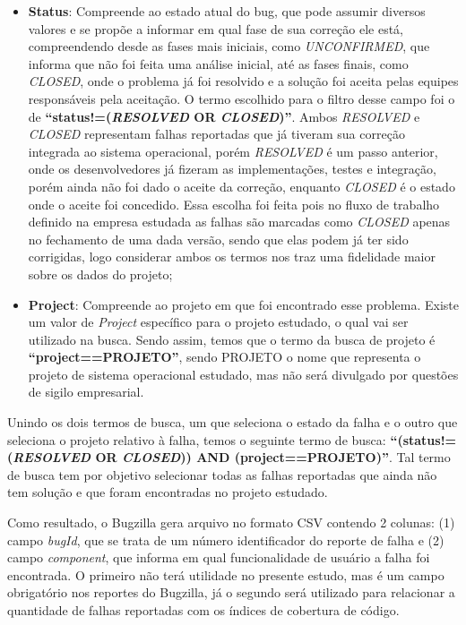 \documentclass[11.5pt]{article}
\begin{document}
\begin{itemize}
    \item \textbf{Status}: Compreende ao estado atual do bug, que pode assumir diversos valores e
          se propõe a informar em qual fase de sua correção ele está, compreendendo desde as fases
          mais iniciais, como \textit{UNCONFIRMED}, que informa que não foi feita uma análise
          inicial, até as fases finais, como \textit{CLOSED}, onde o problema já foi resolvido e
          a solução foi aceita pelas equipes responsáveis pela aceitação.
          O termo escolhido para o filtro desse campo foi o de
          \textbf{``status!=(\textit{RESOLVED} OR \textit{CLOSED})''}.
          Ambos \textit{RESOLVED} e \textit{CLOSED} representam falhas reportadas que já tiveram sua
          correção integrada ao sistema operacional, porém \textit{RESOLVED} é um passo anterior,
          onde os desenvolvedores já fizeram as implementações, testes e integração, porém ainda
          não foi dado o aceite da correção, enquanto \textit{CLOSED} é o estado onde o aceite foi
          concedido.
          Essa escolha foi feita pois no fluxo de trabalho definido na empresa estudada as falhas
          são marcadas como \textit{CLOSED} apenas no fechamento de uma dada versão, sendo que elas
          podem já ter sido corrigidas, logo considerar ambos os termos nos traz uma fidelidade
          maior sobre os dados do projeto;

    \item \textbf{Project}: Compreende ao projeto em que foi encontrado esse problema. Existe um
          valor de \textit{Project} específico para o projeto estudado, o qual vai ser utilizado na
          busca. Sendo assim, temos que o termo da busca de projeto é
          \textbf{``project==PROJETO''}, sendo PROJETO o nome que representa o projeto de sistema
          operacional estudado, mas não será divulgado por questões de sigilo empresarial.
\end{itemize}

Unindo os dois termos de busca, um que seleciona o estado da falha e o outro que seleciona o projeto
relativo à falha, temos o seguinte termo de busca:
\textbf{``(status!=(\textit{RESOLVED} OR \textit{CLOSED})) AND (project==PROJETO)''}.
Tal termo de busca tem por objetivo selecionar todas as falhas reportadas que ainda não tem solução
e que foram encontradas no projeto estudado.

Como resultado, o Bugzilla gera arquivo no formato CSV contendo 2 colunas:
(1) campo \textit{bugId}, que se trata de um número identificador do reporte de falha e
(2) campo \textit{component}, que informa em qual funcionalidade de usuário a falha foi encontrada.
O primeiro não terá utilidade no presente estudo, mas é um campo obrigatório nos reportes do
Bugzilla, já o segundo será utilizado para relacionar a quantidade de falhas reportadas com os
índices de cobertura de código.
\end{document}
